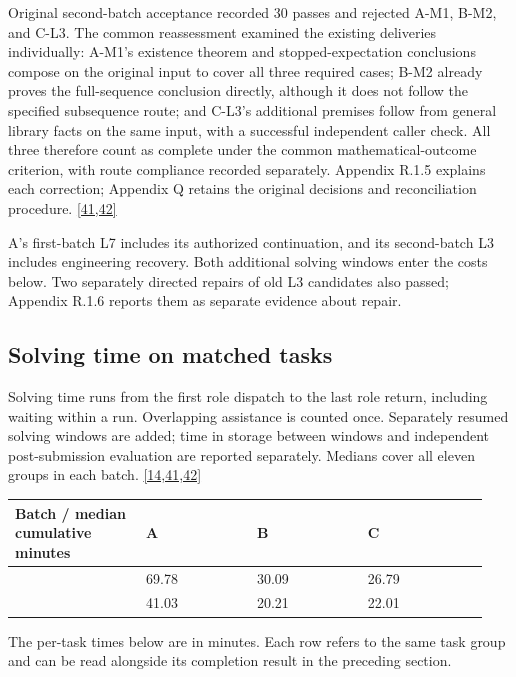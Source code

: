 Original second-batch acceptance recorded 30 passes and rejected A-M1, B-M2, and C-L3. The common reassessment examined the existing deliveries individually: A-M1's existence theorem and stopped-expectation conclusions compose on the original input to cover all three required cases; B-M2 already proves the full-sequence conclusion directly, although it does not follow the specified subsequence route; and C-L3's additional premises follow from general library facts on the same input, with a successful independent caller check. All three therefore count as complete under the common mathematical-outcome criterion, with route compliance recorded separately. Appendix R.1.5 explains each correction; Appendix Q retains the original decisions and reconciliation procedure. \hyperlink{ref-41}{\mbox{[41,42]}}

A's first-batch L7 includes its authorized continuation, and its second-batch L3 includes engineering recovery. Both additional solving windows enter the costs below. Two separately directed repairs of old L3 candidates also passed; Appendix R.1.6 reports them as separate evidence about repair.

\subsection[Solving time on matched tasks]{\texorpdfstring{\protect\hypertarget{section-3-2}{}Solving time on matched tasks}{Solving time on matched tasks}}
Solving time runs from the first role dispatch to the last role return, including waiting within a run. Overlapping assistance is counted once. Separately resumed solving windows are added; time in storage between windows and independent post-submission evaluation are reported separately. Medians cover all eleven groups in each batch. \hyperlink{ref-14}{\mbox{[14,41,42]}}

\begingroup\small\setlength{\tabcolsep}{3pt}\renewcommand{\arraystretch}{1.14}
\par\nopagebreak\medskip\noindent\begin{minipage}[t]{\linewidth}
\begin{tabular}{>{\raggedright\arraybackslash}p{0.26\linewidth}>{\raggedright\arraybackslash}p{0.22\linewidth}>{\raggedright\arraybackslash}p{0.22\linewidth}>{\raggedright\arraybackslash}p{0.24\linewidth}}
\toprule
\textbf{Batch / median cumulative minutes} & \textbf{A} & \textbf{B} & \textbf{C}\\\midrule

{1} & {69.78} & {30.09} & {26.79}\\
{2} & {41.03} & {20.21} & {22.01}\\
\bottomrule\end{tabular}\end{minipage}\par\medskip\endgroup
The per-task times below are in minutes. Each row refers to the same task group and can be read alongside its completion result in the preceding section.

